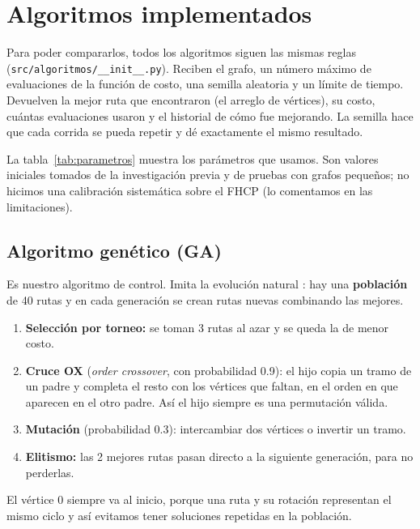 \chapter{Algoritmos implementados}
\label{cap:alg}

Para poder compararlos, todos los algoritmos siguen las mismas reglas
(\nolinkurl{src/algoritmos/__init__.py}). Reciben el grafo, un número máximo de evaluaciones
de la función de costo, una semilla aleatoria y un límite de tiempo. Devuelven la mejor ruta que
encontraron (el arreglo de vértices), su costo, cuántas evaluaciones usaron y el historial de cómo
fue mejorando. La semilla hace que cada corrida se pueda repetir y dé exactamente el mismo
resultado.

La tabla~\ref{tab:parametros} muestra los parámetros que usamos. Son valores iniciales tomados de
la investigación previa y de pruebas con grafos pequeños; no hicimos una calibración sistemática
sobre el FHCP (lo comentamos en las limitaciones).

\begin{table}[H]
\centering\small\filas
\caption{Parámetros usados en los experimentos. \emph{auto} quiere decir que el valor se calcula
según el tamaño del grafo o el presupuesto.}
\label{tab:parametros}

\end{table}

\section{Algoritmo genético (GA)}
\label{sec:ga}
Es nuestro algoritmo de control. Imita la evolución natural \cite{abc4}: hay una \textbf{población} de 40 rutas y en
cada generación se crean rutas nuevas combinando las mejores.
\begin{enumerate}
  \item \textbf{Selección por torneo:} se toman 3 rutas al azar y se queda la de menor costo.
  \item \textbf{Cruce OX} (\emph{order crossover}, con probabilidad 0.9): el hijo copia un tramo
        de un padre y completa el resto con los vértices que faltan, en el orden en que aparecen
        en el otro padre. Así el hijo siempre es una permutación válida.
  \item \textbf{Mutación} (probabilidad 0.3): intercambiar dos vértices o invertir un tramo.
  \item \textbf{Elitismo:} las 2 mejores rutas pasan directo a la siguiente generación, para no
        perderlas.
\end{enumerate}
El vértice 0 siempre va al inicio, porque una ruta y su rotación representan el mismo ciclo y así
evitamos tener soluciones repetidas en la población.

